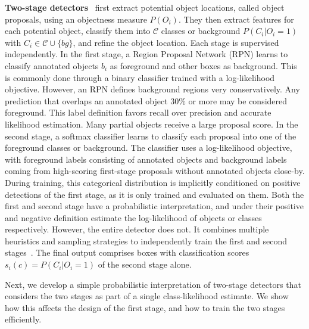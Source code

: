 \documentclass{article}
\begin{document}
\textbf{Two-stage detectors}~\cite{ren2015faster,cai2018cascade} first extract potential object locations, called object proposals, using an objectness measure $P(O_i)$.
They then extract features for each potential object, classify them into $\mathcal{C}$ classes or background ${P(C_i | O_i=1)}$ with $C_i \in \mathcal{C} \cup \{bg\}$, and refine the object location.
Each stage is supervised independently.
In the first stage, a Region Proposal Network (RPN) learns to classify annotated objects $b_i$ as foreground and other boxes as background.
This is commonly done through a binary classifier trained with a log-likelihood objective.
However, an RPN defines background regions very conservatively.
Any prediction that overlaps an annotated object $30\%$ or more may be considered foreground.
This label definition favors recall over precision and accurate likelihood estimation.
Many partial objects receive a large proposal score.
In the second stage, a softmax classifier learns to classify each proposal into one of the foreground classes or background.
The classifier uses a log-likelihood objective, with foreground labels consisting of annotated objects and background labels coming from high-scoring first-stage proposals without annotated objects close-by.
During training, this categorical distribution is implicitly conditioned on positive detections of the first stage, as it is only trained and evaluated on them.
Both the first and second stage have a probabilistic interpretation, and 
under their positive and negative definition 
estimate the log-likelihood of objects or classes respectively.
However, the entire detector does not.
It combines multiple heuristics and sampling strategies to independently train the first and second stages~\cite{cai2018cascade,ren2015faster}.
The final output comprises boxes with classification scores $s_i(c) = P(C_i|O_i=1)$ of the second stage alone.

Next, we develop a simple probabilistic interpretation of two-stage detectors that considers the two stages as part of a single class-likelihood estimate.
We show how this affects the design of the first stage, and how to train the two stages efficiently.
\end{document}
